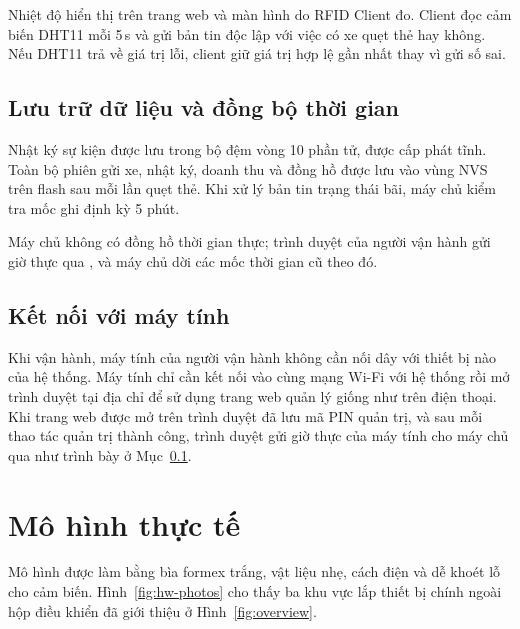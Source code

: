 Nhiệt độ hiển thị trên trang web và màn hình do RFID Client đo. Client đọc cảm biến DHT11 mỗi
5\,s và gửi
bản tin  độc lập với việc có xe quẹt thẻ hay không. Nếu DHT11 trả về giá trị lỗi,
client giữ giá trị hợp lệ gần nhất thay vì gửi số sai.

\subsection{Lưu trữ dữ liệu và đồng bộ thời gian}\label{sec:f-storage}
Nhật ký sự kiện được lưu trong bộ đệm vòng 10 phần tử, được cấp phát tĩnh. Toàn bộ phiên gửi xe, nhật ký, doanh thu và đồng hồ được lưu vào vùng NVS trên flash sau mỗi lần
quẹt thẻ. Khi xử lý bản tin trạng thái bãi, máy chủ kiểm tra mốc ghi định kỳ 5 phút.

Máy chủ không có đồng hồ thời gian thực; trình duyệt
của người vận hành gửi giờ thực qua , và máy chủ dời các mốc thời gian cũ
theo đó.

\subsection{Kết nối với máy tính}\label{sec:f-pc}
Khi vận hành, máy tính của người vận hành không cần nối dây với thiết bị nào của hệ thống. Máy
tính chỉ cần kết nối vào cùng mạng Wi-Fi với hệ thống rồi mở trình duyệt tại địa chỉ
 để sử dụng trang web quản lý giống như trên điện thoại. Khi trang web được
mở trên trình duyệt đã lưu mã PIN quản trị, và sau mỗi thao tác quản trị thành công, trình duyệt
gửi giờ thực của máy tính cho máy chủ qua  như trình bày ở
Mục~\ref{sec:f-storage}.

\section{Mô hình thực tế}\label{sec:mohinh}
Mô hình được làm bằng bìa formex trắng, vật liệu nhẹ, cách điện và dễ khoét lỗ cho cảm biến.
Hình~\ref{fig:hw-photos} cho thấy ba khu vực lắp thiết bị chính ngoài hộp điều khiển đã giới
thiệu ở Hình~\ref{fig:overview}.

